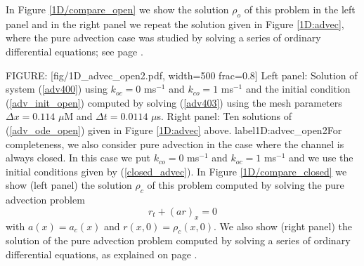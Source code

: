 \bigskip 
In Figure \ref{1D/compare_open} we show the solution $\rho_{o}$ of this problem in
the left panel and in the right panel we repeat the solution given in Figure
\ref{1D:advec}, where the pure advection case was studied by solving a series of ordinary
differential equations; see page \pageref{1D:advec}. 


FIGURE: [fig/1D_advec_open2.pdf, width=500 frac=0.8] Left panel: Solution of system (\ref{adv400})  using  $k_{oc}=0$ ms$^{-1}$  and $k_{co}=1$ ms$^{-1}$ and the initial condition (\ref{adv_init_open}) computed by solving (\ref{adv403})  using the mesh parameters $\Delta x = 0.114$ $\mu$M and $\Delta t = 0.0114$ $\mu$s. Right panel: Ten solutions of (\ref{adv_ode_open}) given in Figure \ref{1D:advec} above. \label{1D/compare_open} label{1D:advec_open2}For completeness, we also consider pure advection in the case where 
the channel is always closed. In this case we put $k_{co}=0$ ms$^{-1}$ and $k_{oc}=1$ ms$^{-1}$
and we use the initial conditions given by (\ref{closed_advec}). In Figure 
\ref{1D/compare_closed} we show
(left panel) the solution $\rho_{c}$ of this problem computed by solving the
pure advection problem
\begin{equation}
r_{t}+\left(  ar\right)  _{x}=0
\end{equation}
with $a(x)=a_{c}(x)$ and $r(x,0)=\rho_{c}(x,0).$ We also show (right
panel) the solution of the pure advection problem computed by solving a series
of ordinary differential equations, as explained on page \pageref{closed_advec}.



